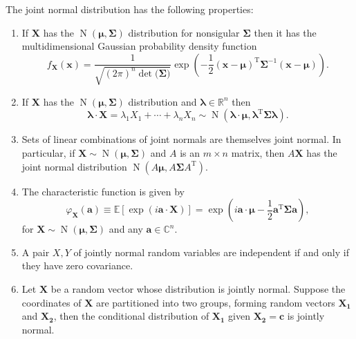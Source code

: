 \documentclass[12pt]{article}
\newcommand{\trnsp}[1]{#1^{\operatorname{T}}}
\newcommand{\bs}[1]{\boldsymbol{#1}}
\begin{document}
The joint normal distribution has the following properties:
\begin{enumerate}
\item If $\bs{X}$ has the $\operatorname{N}(\bs{\mu},\bs{\Sigma})$ distribution for nonsigular $\bs{\Sigma}$ then it has the multidimensional Gaussian probability density function
\begin{equation*}
f_{\bs{X}}(\bs{x})=\frac{1
}{\sqrt{(2\pi)^n \det{\bs{(\Sigma})}}}
\exp\left(-\frac{1}{2}\trnsp{(\bs{x} -  \bs{\mu})}\bs{\Sigma}^{-1} (\bs{x} -  \bs{\mu})\right).
\end{equation*}
\item If $\bs{X}$ has the $\operatorname{N}(\bs{\mu},\bs{\Sigma})$ distribution and $\bs{\lambda}\in\mathbb{R}^n$ then
\begin{equation*}
\bs{\lambda}\cdot\bs{X}=\lambda_1X_1+\cdots+\lambda_nX_n\sim\operatorname{N}(\bs{\lambda}\cdot\bs{\mu},\trnsp{\bs{\lambda}}\bs{\Sigma}\bs{\lambda}).
\end{equation*}
\item Sets of linear combinations of joint normals are themselves joint normal. In particular, if $\bs{X}\sim\operatorname{N}(\bs{\mu},\bs{\Sigma})$ and $A$ is an $m\times n$ matrix, then $A\bs{X}$ has the joint normal distribution $\operatorname{N}(A\bs{\mu},A\bs{\Sigma}\trnsp{A})$.
\item The characteristic function is given by
\begin{equation*}
\varphi_{\bs{X}}(\bs{a})\equiv\mathbb{E}\left[\exp(i\bs{a}\cdot\bs{X})\right]=\exp\left(i\bs{a}\cdot\bs{\mu}-\frac{1}{2}\trnsp{\bs{a}}\bs{\Sigma}\bs{a}\right),
\end{equation*}
for $\bs{X}\sim\operatorname{N}(\bs{\mu},\bs{\Sigma})$ and any $\bs{a}\in\mathbb{C}^n$.
\item A pair $X,Y$ of jointly normal random variables are independent if and only if they have zero covariance.
\item Let $\bs{X}$ be a random vector whose distribution is jointly
normal.  Suppose the coordinates of $\bs{X}$ are partitioned
into two groups, forming random vectors $\bs{X_1}$ and
$\bs{X_2}$, then the conditional distribution of
$\bs{X_1}$ given $\bs{X_2}=\bs{c}$ is
jointly normal.
\end{enumerate}

\end{document}
